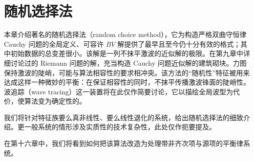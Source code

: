 \documentclass[../main.tex]{subfiles}
\begin{document}
\chapter{随机选择法}\label{chapter:ch13-随机选择法}

本章介绍著名的随机选择法（random choice method），它为构造严格双曲守恒律 Cauchy 问题的全局定义、可容许 $BV$ 解提供了最早且至今仍十分有效的格式；其中初始数据的总变差很小。该解是一列不抹平激波的近似解的极限。在第九章中详细讨论过的 Riemann 问题的解，充当构造 Cauchy 问题近似解的建筑砌块。力图保持激波的陡峭，可能与算法相容性的要求相冲突。该方法的``随机性''特征被用来达成这样一种微妙的平衡：在保证相容性的同时，不抹平传播激波锋面的陡峭性。波追踪（wave tracing）这一装置将在此仅作简要讨论，它以描绘全局波型为代价，使算法变为确定性的。

我们将针对特征族要么真非线性、要么线性退化的系统，给出随机选择法的细致介绍。更一般系统的情形涉及实质性的技术复杂性，此处仅作扼要提及。

在第十六章中，我们将看到如何把该算法改造为处理带非齐次项与源项的平衡律系统。










\end{document}
